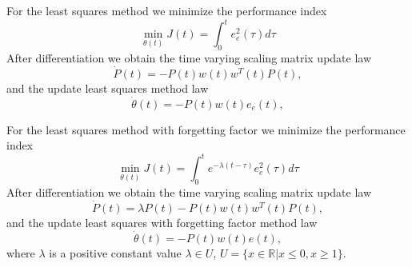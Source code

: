 \documentclass[12pt]{article}
\begin{document}
For the least squares method we minimize the performance index
\begin{equation}
\min_{\theta(t)} J(t) = \int_0^t e_e^2(\tau) d\tau
\end{equation} 
After differentiation we obtain the time varying scaling matrix update law
\begin{equation}
\dot{P}(t) = -P(t) w(t)w^T(t)P(t),
\end{equation} 
and the update least squares method law
\begin{equation}
\dot{\theta}(t) = -P(t) w(t)e_e(t),
\end{equation}

For the least squares method with forgetting factor we minimize the performance index
\begin{equation}
\min_{\theta(t)} J(t) = \int_{0}^{t} e^{-\lambda (t-\tau)} e_e^2(\tau) d\tau
\end{equation} 
After differentiation we obtain the time varying scaling matrix update law
\begin{equation}
\dot{P}(t) = \lambda P(t)-P(t) w(t)w^T(t)P(t),
\end{equation} 
and the update least squares with forgetting factor method law
\begin{equation}
\dot{\theta}(t) = -P(t) w(t)e(t),
\end{equation}
where $\lambda$ is a positive constant value $\lambda \in U$, $U=\{x\in \mathbb{R}|x\leq 0, x \geq 1\}$.
\end{document}
